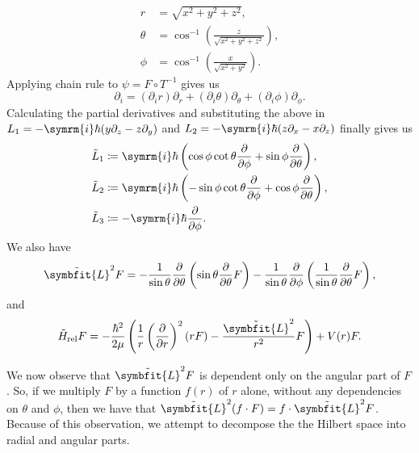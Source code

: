\documentclass[12pt, a4 paper]{article}
\theoremstyle{definition}
\renewcommand{\i}{\symrm{i}}
\newcommand{\angsone}{\tilde{L}_1}
\newcommand{\angstwo}{\tilde{L}_2}
\newcommand{\angsthree}{\tilde{L}_3}
\newcommand{\lvecsquare}{\tilde{\symbfit{L}}^2}
\begin{document}
    \begin{align*}
        r      &= \sqrt{x^2 + y^2 + z^2},\\
        \theta &= \cos^{-1}{\left(\frac{z}{\sqrt{x^2 + y^2 + z^2}}\right)},\\
        \phi   &= \cos^{-1}{\left(\frac{x}{\sqrt{x^2 + y^2}}\right)}.
    \end{align*}
    Applying chain rule to $\psi = F \circ T^{-1}$ gives us
    \[
        \partial_i = (\partial_i r)\partial_r + (\partial_i \theta)\partial_\theta + (\partial_i \phi)\partial_\phi.
    \]
    Calculating the partial derivatives and substituting the above in $L_1 = -\i\hbar(y\partial_z - z\partial_y)$ and $L_2 = -\i\hbar(z\partial_x - x\partial_z)$ finally gives us
    \begin{align*}
        \angsone &\coloneq \i\hbar\left(\cos{\phi}\cot{\theta}\frac{\partial}{\partial\phi} + \sin{\phi}\frac{\partial}{\partial\theta}\right),\\
        \angstwo &\coloneq \i\hbar\left(-\sin{\phi}\cot{\theta}\frac{\partial}{\partial\phi} + \cos{\phi}\frac{\partial}{\partial\theta}\right),\\
        \angsthree &\coloneq -\i\hbar \frac{\partial}{\partial\phi}.
    \end{align*}
    We also have
    \[
        \lvecsquare F = -\frac{1}{\sin{\theta}}\frac{\partial}{\partial \theta}\left(\sin{\theta}\frac{\partial}{\partial\theta}F\right) -\frac{1}{\sin{\theta}}\frac{\partial}{\partial\phi}\left(\frac{1}{\sin{\theta}}\frac{\partial}{\partial\theta}F\right),
    \]
    and
    \[
        \tilde{H}_\text{rel} F = -\frac{\hbar^2}{2\mu}\left(\frac{1}{r}\left(\frac{\partial}{\partial r}\right)^2 (rF) - \frac{\lvecsquare}{r^2}F\right) + V(r)F.
    \]

    We now observe that $\lvecsquare F$ is dependent only on the angular part of $F$. So, if we multiply $F$ by a function $f(r)$ of $r$ alone, without any dependencies on $\theta$ and $\phi$, then we have that $\lvecsquare(f\cdot F) = f \cdot \lvecsquare F$. Because of this observation, we attempt to decompose the the Hilbert space into radial and angular parts.
\end{document}
